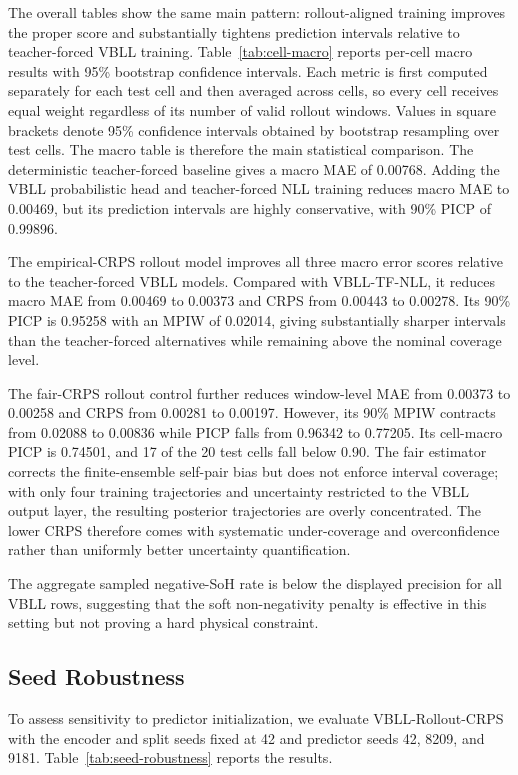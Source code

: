 \documentclass[conference]{IEEEtran}
\begin{document}
The overall tables show the same main pattern: rollout-aligned training
improves the proper score and substantially tightens prediction intervals
relative to teacher-forced VBLL training.
Table~\ref{tab:cell-macro} reports per-cell macro results with 95\% bootstrap
confidence intervals. Each metric is first computed separately for each test
cell and then averaged across cells, so every cell receives equal weight
regardless of its number of valid rollout windows. Values in square brackets
denote 95\% confidence intervals obtained by bootstrap resampling over test
cells. The macro table is therefore the main statistical comparison. The
deterministic teacher-forced baseline gives a macro MAE of 0.00768. Adding the
VBLL probabilistic head and teacher-forced NLL training reduces macro MAE to
0.00469, but its prediction intervals are highly conservative, with 90\% PICP
of 0.99896.

The empirical-CRPS rollout model improves all three macro error scores relative
to the teacher-forced VBLL models. Compared with VBLL-TF-NLL, it reduces macro
MAE from 0.00469 to 0.00373 and CRPS from 0.00443 to 0.00278. Its 90\% PICP is
0.95258 with an MPIW of 0.02014, giving substantially sharper intervals than
the teacher-forced alternatives while remaining above the nominal coverage
level.

The fair-CRPS rollout control further reduces window-level MAE from 0.00373 to
0.00258 and CRPS from 0.00281 to 0.00197. However, its 90\% MPIW contracts from
0.02088 to 0.00836 while PICP falls from 0.96342 to 0.77205. Its cell-macro
PICP is 0.74501, and 17 of the 20 test cells fall below 0.90. The fair estimator
corrects the finite-ensemble self-pair bias but does not enforce interval
coverage; with only four training trajectories and uncertainty restricted to
the VBLL output layer, the resulting posterior trajectories are overly
concentrated. The lower CRPS therefore comes with systematic under-coverage
and overconfidence rather than uniformly better uncertainty quantification.

The aggregate sampled negative-SoH rate is below the displayed precision for
all VBLL rows, suggesting that the soft non-negativity penalty is effective in
this setting but not proving a hard physical constraint.

\subsection{Seed Robustness}

To assess sensitivity to predictor initialization, we evaluate
VBLL-Rollout-CRPS with the encoder and split seeds fixed at 42 and predictor
seeds 42, 8209, and 9181. Table~\ref{tab:seed-robustness} reports the results.
\end{document}
